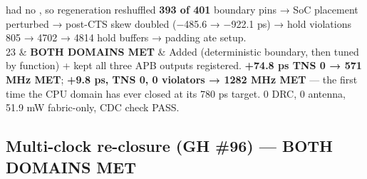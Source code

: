 \begin{record}
{{\begin{longtable}[]
had no , so regeneration reshuffled \textbf{393
of 401} boundary pins → SoC placement perturbed → post-CTS
 skew doubled (−485.6 → −922.1 ps) → hold violations 805 →
4702 → 4814 hold buffers → padding ate setup. \\
23 & \textbf{BOTH DOMAINS MET} & Added 
(deterministic boundary, then tuned by function) + kept all three APB
outputs registered.  \textbf{+74.8 ps TNS 0 → 571 MHz
MET};  \textbf{+9.8 ps, TNS 0, 0 violators → 1282 MHz MET}
--- the first time the CPU domain has ever closed at its 780 ps target.
0 DRC, 0 antenna, 51.9 mW \warn{} fabric-only, CDC check PASS. \\
\end{longtable}
}

}

\end{record}

\subsection{Multi-clock re-closure (GH \#96) --- BOTH DOMAINS MET}\label{cr:run:phase5:multi-clock-re-closure-gh-96-both-domains-met}

